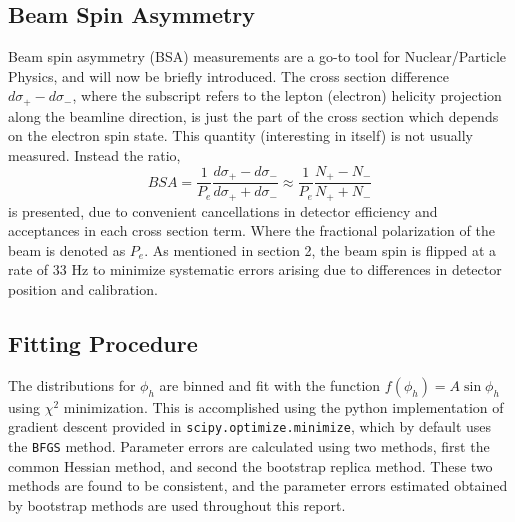 \subsection{Beam Spin Asymmetry}
Beam spin asymmetry (BSA) measurements are a go-to tool for Nuclear/Particle Physics, and will now be briefly introduced.  The cross section difference $d\sigma_{+} - d\sigma_{-}$, where the subscript refers to the lepton (electron) helicity projection along the beamline direction, is just the part of the cross section which depends on the electron spin state.  This quantity (interesting in itself) is not usually measured.  Instead the ratio,
\begin{equation}
	BSA = \frac{1}{P_e} \frac{d\sigma_{+} - d\sigma_{-}}{d\sigma_{+} + d\sigma_{-}} \approx \frac{1}{P_e} \frac{N_+ - N_-}{N_+ + N_-}
\end{equation}    
is presented, due to convenient cancellations in detector efficiency and acceptances in each cross section term.  Where the fractional polarization of the beam is denoted as $P_e$.  As mentioned in section 2, the beam spin is flipped at a rate of 33 Hz to minimize systematic errors arising due to differences in detector position and calibration.  
\\

\subsection{Fitting Procedure}
The distributions for $\phi_h$ are binned and fit with the function $f(\phi_h) = A\sin{\phi_h}$ using $\chi^2$ minimization.  This is accomplished using the python implementation of gradient descent provided in \texttt{scipy.optimize.minimize}, which by default uses the \texttt{BFGS} method.  Parameter errors are calculated using two methods, first the common Hessian method, and second the bootstrap replica method.  These two methods are found to be consistent, and the parameter errors estimated obtained by bootstrap methods are used throughout this report.   
\\    
